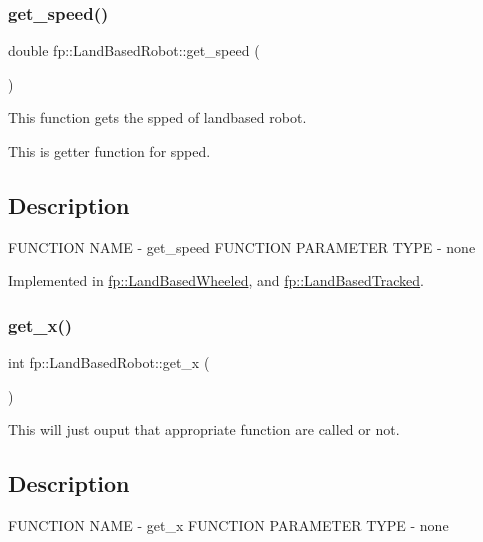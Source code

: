 \subsubsection{\texorpdfstring{get\+\_\+speed()}{get\_speed()}}
{\footnotesize\ttfamily double fp\+::\+Land\+Based\+Robot\+::get\+\_\+speed (\begin{DoxyParamCaption}{ }\end{DoxyParamCaption})\hspace{0.3cm}{\ttfamily [pure virtual]}}



This function gets the spped of landbased robot. 

This is getter function for spped.\hypertarget{main_8cpp_Description}{}\subsection{Description}\label{main_8cpp_Description}
F\+U\+N\+C\+T\+I\+ON N\+A\+ME -\/ get\+\_\+speed F\+U\+N\+C\+T\+I\+ON P\+A\+R\+A\+M\+E\+T\+ER T\+Y\+PE -\/ none 

Implemented in \hyperlink{classfp_1_1_land_based_wheeled_ab687789dad29fe8178ed1e60bd79500f}{fp\+::\+Land\+Based\+Wheeled}, and \hyperlink{classfp_1_1_land_based_tracked_a5c5c280d150b040bd5f862f2f64d83f1}{fp\+::\+Land\+Based\+Tracked}.

\mbox{\label{classfp_1_1_land_based_robot_a3624c5d041de0987c0103c6b01fa9bc6}} 
\subsubsection{\texorpdfstring{get\+\_\+x()}{get\_x()}}
{\footnotesize\ttfamily int fp\+::\+Land\+Based\+Robot\+::get\+\_\+x (\begin{DoxyParamCaption}{ }\end{DoxyParamCaption})\hspace{0.3cm}{\ttfamily [pure virtual]}}



This will just ouput that appropriate function are called or not. 

\hypertarget{main_8cpp_Description}{}\subsection{Description}\label{main_8cpp_Description}
F\+U\+N\+C\+T\+I\+ON N\+A\+ME -\/ get\+\_\+x F\+U\+N\+C\+T\+I\+ON P\+A\+R\+A\+M\+E\+T\+ER T\+Y\+PE -\/ none 

